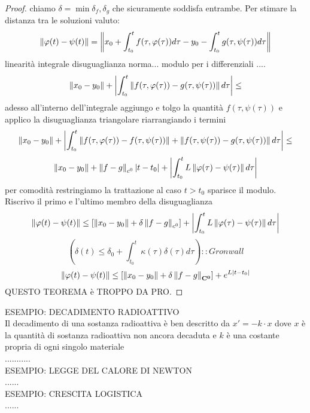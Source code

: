 \begin{proof}
	chiamo $\delta=\min{\delta_f,\delta_g}$ che sicuramente soddisfa entrambe. Per stimare la distanza tra le soluzioni valuto:
	$$
	\left\|\varphi(t)-\psi(t)\right\|=
	\left\| x_0+\int_{t_0}^t f(\tau,\varphi(\tau))d\tau - y_0 - \int_{t_0}^t g(\tau,\psi(\tau))d\tau\right\|
	$$
	linearità integrale disuguaglianza norma... modulo per i differenziali ....\\
	$$ \left\|x_0-y_0\right\|+\left|\int_{t_0}^{t} \left\|f(\tau,\varphi(\tau))-g(\tau,\psi(\tau))\right\|d\tau\right|\le$$
	adesso all'interno dell'integrale aggiungo e tolgo la quantità $f(\tau,\psi(\tau))$ e applico la disuguaglianza triangolare riarrangiando i termini
	$$ \left\|x_0-y_0\right\|+\left|\int_{t_0}^{t} \left\|f(\tau,\varphi(\tau))-f(\tau,\psi(\tau))\right\|+\left\|f(\tau,\psi(\tau))-g(\tau,\psi(\tau))\right\|d\tau\right|\le$$
	$$ \left\|x_0-y_0\right\| + \left\|f-g\right\|_{c^0}\left|t-t_0\right| +\left|\int_{t_0}^{t} L\left\|\varphi(\tau)-\psi(\tau)\right\| d\tau\right|$$
	per comodità restringiamo la trattazione al caso $t>t_0$ sparisce il modulo. Riscrivo il primo e l'ultimo membro della disuguaglianza
	$$ \left\|\varphi(t)-\psi(t)\right\|\le  \left[ \left\|x_0-y_0\right\| + \delta\left\|f-g\right\|_{c^0}\right] +\left|\int_{t_0}^{t} L\left\|\varphi(\tau)-\psi(\tau)\right\| d\tau\right|$$
	$$ \left( \delta(t)\le\delta_0+\int_{t_0}^t \kappa(\tau)\delta(\tau)d\tau \right)::Gronwall$$
	$$ \left\|\varphi(t)-\psi(t)\right\|\le\left[\left\|x_0-y_0\right\|+\delta\left\|f-g\right\|_{\mathbf{C^{0}}}\right]+e^{L\left|t-t_0\right|}$$
	QUESTO TEOREMA è TROPPO DA PRO.
\end{proof}
ESEMPIO: DECADIMENTO RADIOATTIVO\\
Il decadimento di una sostanza radioattiva è ben descritto da $ x'=-k\cdot x$ dove $x$ è la quantità di sostanza radioattiva non ancora decaduta e $k$ è una costante propria di ogni singolo materiale\\
...........\\
ESEMPIO: LEGGE DEL CALORE DI NEWTON\\
......\\
ESEMPIO: CRESCITA LOGISTICA\\
......\\
